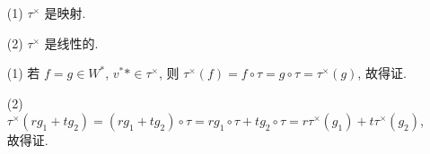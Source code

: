 \documentclass{note}
\begin{document}
\begin{itemize}
    \item[(1)] $\tau^{\times}$ 是映射.
    \item[(2)] $\tau^{\times}$ 是线性的.
\end{itemize}
\begin{pf}
    \begin{itemize}
        \item[(1)] 若 $f=g\in W^*$, $v^**\in\tau^{\times}$, 则 $\tau^{\times}(f)=f\circ\tau=g\circ\tau=\tau^{\times}(g)$, 故得证.
        \item[(2)] $\tau^{\times}(rg_1+tg_2)=(rg_1+tg_2)\circ\tau=rg_1\circ\tau+tg_2\circ\tau=r\tau^{\times}(g_1)+t\tau^{\times}(g_2)$, 故得证.
    \end{itemize}
\end{pf}
\end{document}
